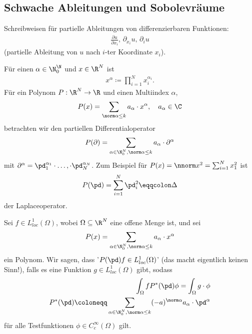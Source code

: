 \subsection{Schwache Ableitungen und Sobolevräume}
\label{sec:schw-able-und}

Schreibweisen für partielle Ableitungen von differenzierbaren Funktionen:
\begin{align*}
  \frac{\partial u}{\partial x_{i}}, \, \partial_{x_{i}} u, \, \partial_{i} u
\end{align*}
(partielle Ableitung von $u$ nach $i$-ter Koordinate $x_{i}$). 

Für einen  $\alpha \in \N_{0}^{\N}$ und $x \in \R^{N}$ ist
\begin{align*}
  x^{\alpha}\coloneqq \prod_{i = 1}^{N} x_{i}^{\alpha_{i}}. 
\end{align*}
Für ein Polynom $P: \R^{N} \to \R$ und einen Multiindex $\alpha$,
\begin{align*}
  P(x) = \sum_{\norm \alpha\leq k} a_{\alpha}\cdot x^{\alpha}, \quad a_{\alpha} \in \C
\end{align*}
betrachten wir den partiellen Differentialoperator
\begin{align*}
  P(\partial) = \sum_{\alpha \in \N_{0}^{N}, \norm \alpha \leq k} a_{\alpha}\cdot \partial^{\alpha}
\end{align*}
mit $\partial^{\alpha} = \pd_{1}^{\alpha_{1}} \cdot \dots, \cdot \pd_{N}^{\alpha_{N}}$. Zum Beispiel für $P(x) = \nnorm x^{2} = \sum_{i = 1}^{N} x_{1}^{2}$ ist
\begin{align*}
  P(\pd) = \sum_{i = 1}^{N} \pd_{i}^{2} \eqqcolon \Delta
\end{align*}
der Laplaceoperator. 

Sei $f \in L^{1}_{loc}(\Omega)$, wobei $\Omega \subseteq \R^{N}$ eine offene Menge ist, und sei
\begin{align*}
  P(x) =  \sum_{\alpha \in \N_{0}^{N}, \norm \alpha \leq k} a_{\alpha}\cdot x^{\alpha}
\end{align*}
ein Polynom. Wir sagen, dass '$P(\pd)f \in L^{1}_{loc}(\Omega)$' (das macht eigentlich keinen Sinn!), falls es eine Funktion $g \in L^{1}_{loc}(\Omega)$ gibt, sodass
\begin{align*}
  \int_{\Omega}f P^{*}(\pd) \phi = \int_{\Omega} g\cdot\phi\\
P^{*}(\pd) \coloneqq \sum_{\alpha \in \N_{0}^{N}, \norm \alpha \leq k} (-a)^{\norm \alpha} a_{\alpha}\cdot \pd^{\alpha}
\end{align*}
für alle Testfunktionen $\phi \in C_{c}^{\infty}(\Omega)$ gilt. 

